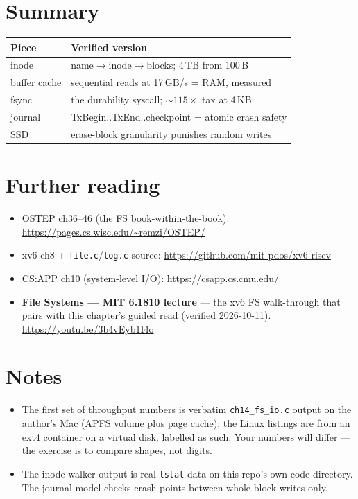 \section{Summary}
\label{sec:summary14}
\begin{tabularx}{\linewidth}{@{}l X@{}}
\toprule
\textbf{Piece} & \textbf{Verified version} \\
\midrule
inode    & name$\to$inode$\to$blocks; 4\,TB from 100\,B \\
buffer cache & sequential reads at 17\,GB/s = RAM, measured \\
fsync    & the durability syscall; $\sim$$115\times$ tax at 4\,KB \\
journal  & TxBegin..TxEnd..checkpoint = atomic crash safety \\
SSD      & erase-block granularity punishes random writes \\
\bottomrule
\end{tabularx}

\section*{Further reading}
\label{sec:further14}
\begin{itemize}
\item OSTEP ch36--46 (the FS book-within-the-book):
      \url{https://pages.cs.wisc.edu/~remzi/OSTEP/}
\item xv6 ch8 + \texttt{file.c}/\texttt{log.c} source:
      \url{https://github.com/mit-pdos/xv6-riscv}
\item CS:APP ch10 (system-level I/O):
      \url{https://csapp.cs.cmu.edu/}
\end{itemize}

\begin{rulebox}
\begin{itemize}
\item \textbf{File Systems --- MIT 6.1810 lecture} --- the xv6 FS
      walk-through that pairs with this chapter's guided read
      (verified 2026-10-11).
      \url{https://youtu.be/3b4vEyb1I4o}
\end{itemize}
\end{rulebox}

\section*{Notes}
\label{sec:notes14}
\begin{itemize}
\item The first set of throughput numbers is verbatim
      \texttt{ch14\_fs\_io.c} output on the author's Mac (APFS volume
      plus page cache); the Linux listings are from an ext4
      container on a virtual disk, labelled as such. Your numbers
      will differ --- the exercise is to compare shapes, not digits.
\item The inode walker output is real \texttt{lstat} data on this
      repo's own code directory. The journal model checks crash
      points between whole block writes only.
\end{itemize}

